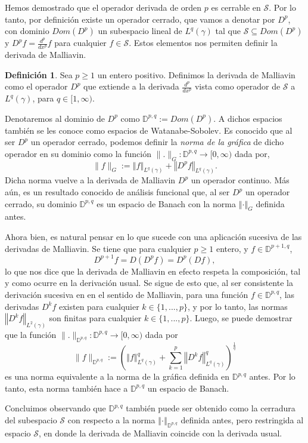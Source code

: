 \documentclass[letterpaper,twoside,12pt]{book}
\newcommand{\D}{\mathbb{D}}
\renewcommand{\S}{\mathcal{S}}
\newcommand{\1}{\mathds{1}}
\newcommand{\norm}[1]{\left\Vert #1 \right\Vert}
\theoremstyle{definition}
\newtheorem{dfn}{Definición}
\theoremstyle{definition}
\theoremstyle{definition}
\theoremstyle{definition}
\theoremstyle{definition}
\theoremstyle{definition}
\theoremstyle{definition}
\begin{document}
Hemos demostrado que el operador derivada de orden $p$ es cerrable en $\S$. Por lo tanto, por definición existe un operador cerrado, que vamos a denotar por $D^{p}$, con dominio $Dom(D^{p})$ un subespacio lineal de $L^{q}(\gamma)$ tal que $\S\subseteq Dom(D^{p})$ y $D^{p}f=\frac{d^{p}}{dx^{p}}f$ para cualquier $f\in \S$. Estos elementos nos permiten definir la derivada de Malliavin.

\begin{dfn}
    Sea $p\geq1$ un entero positivo. Definimos la derivada de Malliavin como el operador $D^{p}$ que extiende a la derivada $\frac{d^{p}}{dx^{p}}$ vista como operador de $\S$ a $L^{q}(\gamma)$, para $q\in [1,\infty)$.
\end{dfn}

Denotaremos al dominio de $D^{p}$ como $\D^{p,q}:=Dom(D^{p})$. A dichos espacios también se les conoce como espacios de Watanabe-Sobolev. Es conocido que al ser $D^{p}$ un operador cerrado, podemos definir la \textit{norma de la gráfica} de dicho operador en su dominio como la función $\|.\|_{G}:\D^{p,q}\longrightarrow[0,\infty)$ dada por,
\[
        \|f\|_{G}:=\norm{f}_{L^q(\gamma)}+\norm{D^{p}f}_{L^{q}(\gamma)}.
    \]
Dicha norma vuelve a la derivada de Malliavin $D^{p}$ un operador continuo. Más aún, es un resultado conocido de análisis funcional que, al ser $D^{p}$ un operador cerrado, su dominio $\D^{p,q}$ es un espacio de Banach con la norma $\norm{\cdot}_{G}$ definida antes.

Ahora bien, es natural pensar en lo que sucede con una aplicación sucesiva de las derivadas de Malliavin. Se tiene que para cualquier $p\geq1$ entero, y $f\in \D^{p+1,q}$, 
\[
    D^{p+1}f=D(D^{p}f)=D^{p}(Df),
\]
lo que nos dice que la derivada de Malliavin en efecto respeta la composición, tal y como ocurre en la derivación usual. Se sigue de esto que, al ser consistente la derivación sucesiva en en el sentido de Malliavin, para una función $f\in \D^{p,q}$, las derivadas $D^{k}f$ existen para cualquier $k\in \{1,...,p\}$, y por lo tanto, las normas $\norm{D^kf}_{L^2(\gamma)}$ son finitas para cualquier $k\in \{1,...,p\}$. Luego, se puede demostrar que la función $\|.\|_{\mathbb{D}^{p,q}}:\D^{p,q}\longrightarrow[0,\infty)$ dada por
\[
    \|f\|_{\D^{p,q}}:=\left(\norm{f}_{L^{q}(\gamma)}^q+\sum_{k=1}^p\norm{D^{k}f}_{L^{q}(\gamma)}^{q}\right)^{\frac{1}{q}}
\] 
es una norma equivalente a la norma de la gráfica definida en $\D^{p,q}$ antes. Por lo tanto, esta norma también hace a $\D^{p,q}$ un espacio de Banach.

Concluimos observando que $\D^{p,q}$ también puede ser obtenido como la cerradura del subespacio $\S$ con respecto a la norma $\norm{\cdot}_{\D^{p,q}}$ definida antes, pero restringida al espacio $\S$, en donde la derivada de Malliavin coincide con la derivada usual.
\end{document}
